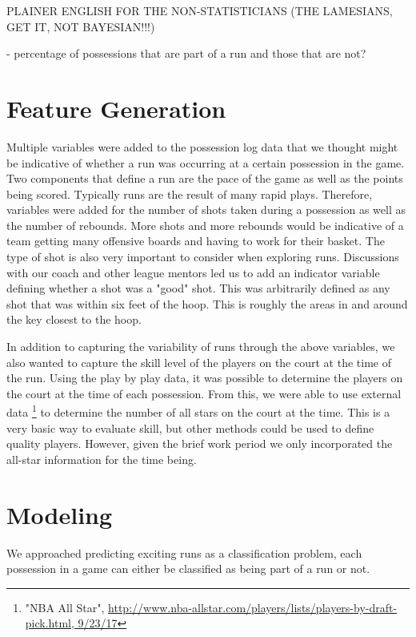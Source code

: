 \documentclass{article}
\begin{document}
PLAINER ENGLISH FOR THE NON-STATISTICIANS (THE LAMESIANS, GET IT, NOT BAYESIAN!!!)

- percentage of possessions that are part of a run and those that are not?

\section{Feature Generation}

Multiple variables were added to the possession log data that we thought might be indicative of whether a run was occurring at a certain possession in the game.  Two components that define a run are the pace of the game as well as the points being scored. Typically runs are the result of many rapid plays. Therefore, variables were added for the number of shots taken during a possession as well as the number of rebounds. More shots and more rebounds would be indicative of a team getting many offensive boards and having to work for their basket. The type of shot is also very important to consider when exploring runs. Discussions with our coach and other league mentors led us to add an indicator variable defining whether a shot was a "good" shot. This was arbitrarily defined as any shot that was within six feet of the hoop. This is roughly the areas in and around the key closest to the hoop. \newline

In addition to capturing the variability of runs through the above variables, we also wanted to capture the skill level of the players on the court at the time of the run. Using the play by play data, it was possible to determine the players on the court at the time of each possession. From this, we were able to use external data \footnote{"NBA All Star", \url{http://www.nba-allstar.com/players/lists/players-by-draft-pick.html, 9/23/17}} to determine the number of all stars on the court at the time. This is a very basic way to evaluate skill, but other methods could be used to define quality players. However, given the brief work period we only incorporated the all-star information for the time being. 

\section{Modeling}

We approached predicting exciting runs as a classification problem, each possession in a game can either be classified as being part of a run or not. \newline
\end{document}
